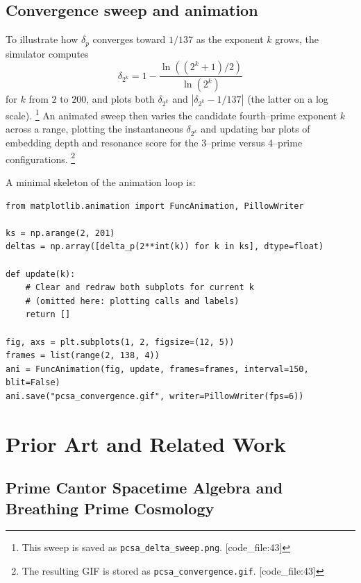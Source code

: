 \documentclass[11pt]{article}
\begin{document}
\subsection{Convergence sweep and animation}

To illustrate how $\delta_p$ converges toward $1/137$ as the exponent $k$ grows, the simulator computes
\[
  \delta_{2^k} = 1 - \frac{\ln\left((2^k+1)/2\right)}{\ln(2^k)}
\]
for $k$ from $2$ to $200$, and plots both $\delta_{2^k}$ and $|\delta_{2^k} - 1/137|$ (the latter on a log scale).%
\footnote{This sweep is saved as \texttt{pcsa\_delta\_sweep.png}. [code\_file:43]} 
An animated sweep then varies the candidate fourth--prime exponent $k$ across a range, plotting the instantaneous $\delta_{2^k}$ and updating bar plots of embedding depth and resonance score for the 3--prime versus 4--prime configurations.%
\footnote{The resulting GIF is stored as \texttt{pcsa\_convergence.gif}. [code\_file:43]} 

A minimal skeleton of the animation loop is:

\begin{verbatim}
from matplotlib.animation import FuncAnimation, PillowWriter

ks = np.arange(2, 201)
deltas = np.array([delta_p(2**int(k)) for k in ks], dtype=float)

def update(k):
    # Clear and redraw both subplots for current k
    # (omitted here: plotting calls and labels)
    return []

fig, axs = plt.subplots(1, 2, figsize=(12, 5))
frames = list(range(2, 138, 4))
ani = FuncAnimation(fig, update, frames=frames, interval=150, blit=False)
ani.save("pcsa_convergence.gif", writer=PillowWriter(fps=6))
\end{verbatim}

\section{Prior Art and Related Work}

\subsection{Prime Cantor Spacetime Algebra and Breathing Prime Cosmology}
\end{document}
